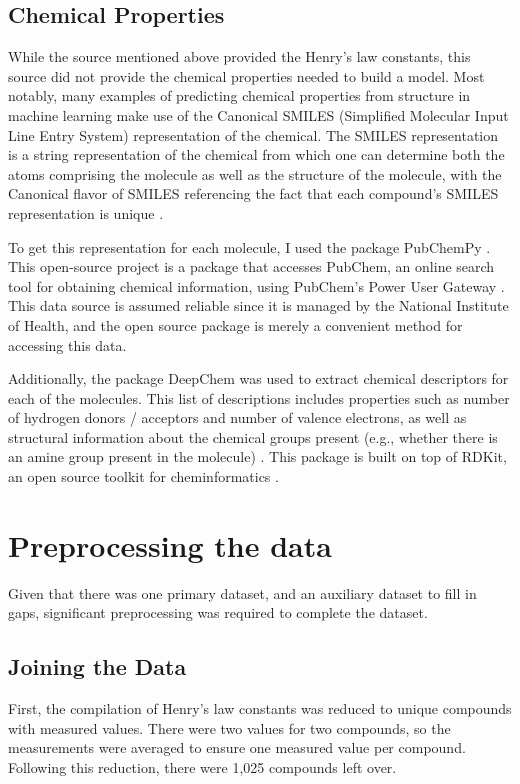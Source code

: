 \documentclass[12pt, oneside]{article}   	%
\begin{document}
\subsection{Chemical Properties}
While the source mentioned above provided the Henry's law constants, this source did not provide the chemical properties needed to build a model. Most notably, many examples of predicting chemical properties from structure in machine learning make use of the Canonical SMILES (Simplified Molecular Input Line Entry System) representation of the chemical. The SMILES representation is a string representation of the chemical from which one can determine both the atoms comprising the molecule as well as the structure of the molecule, with the Canonical flavor of SMILES referencing the fact that each compound's SMILES representation is unique \cite{oboyle2012}.

To get this representation for each molecule, I used the package PubChemPy \cite{PubChemPy}. This open-source project is a package that accesses PubChem, an online search tool for obtaining chemical information, using PubChem's Power User Gateway \cite{kim2015}. This data source is assumed reliable since it is managed by the National Institute of Health, and the open source package is merely a convenient method for accessing this data.

Additionally, the package DeepChem was used to extract chemical descriptors for each of the molecules. This list of descriptions includes properties such as number of hydrogen donors / acceptors and number of valence electrons, as well as structural information about the chemical groups present (e.g., whether there is an amine group present in the molecule) \cite{Ramsundar-et-al-2019}. This package is built on top of RDKit, an open source toolkit for cheminformatics \cite{rdkit}.

\section{Preprocessing the data}
Given that there was one primary dataset, and an auxiliary dataset to fill in gaps, significant preprocessing was required to complete the dataset.

\subsection{Joining the Data}
First, the compilation of Henry's law constants was reduced to unique compounds with measured values. There were two values for two compounds, so the measurements were averaged to ensure one measured value per compound. Following this reduction, there were 1,025 compounds left over.
\end{document}
